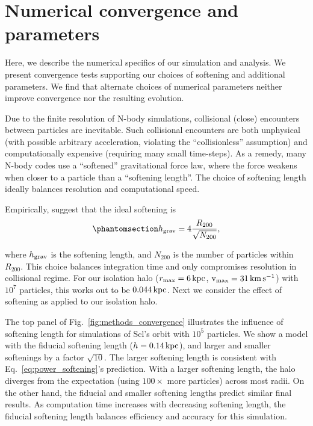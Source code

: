 \chapter{Numerical convergence and
parameters}\label{sec:extra_convergence}

Here, we describe the numerical specifics of our simulation and
analysis. We present convergence tests supporting our choices of
softening and additional parameters. We find that alternate choices of
numerical parameters neither improve convergence nor the resulting
evolution.

Due to the finite resolution of N-body simulations, collisional (close)
encounters between particles are inevitable. Such collisional encounters
are both unphysical (with possible arbitrary acceleration, violating the
``collisionless'' assumption) and computationally expensive (requiring
many small time-steps). As a remedy, many N-body codes use a
``softened'' gravitational force law, where the force weakens when
closer to a particle than a ``softening length''. The choice of
softening length ideally balances resolution and computational speed.

Empirically, \citet{power+2003} suggest that the ideal softening is
\begin{equation}\protect\phantomsection\label{eq:power_softening}{
h_{\rm grav} = 4 \frac{R_{200}}{\sqrt{N_{200}}},
}\end{equation}

where \(h_{\rm grav}\) is the softening length, and \(N_{200}\) is the
number of particles within \(R_{200}\). This choice balances integration
time and only compromises resolution in collisional regime. For our
isolation halo (\(r_{\rm max}=6\,{\rm kpc}\), \({\rm v}_{\rm max}=31\,{\rm km\,s^{-1}}\)) with \(10^7\)
particles, this works out to be \(0.044\,{\rm kpc}\). Next we consider
the effect of softening as applied to our isolation halo.

The top panel of Fig.~\ref{fig:methods_convergence} illustrates the
influence of softening length for simulations of Scl's \smallperi{}
orbit with \(10^5\) particles. We show a model with the fiducial
softening length (\(h=0.14\,{\rm kpc}\)), and larger and smaller softenings
by a factor \(\sqrt{10}\). The larger softening length is consistent
with Eq.~\ref{eq:power_softening}'s prediction. With a larger softening
length, the halo diverges from the expectation (using \(100\times\) more
particles) across most radii. On the other hand, the fiducial and
smaller softening lengths predict similar final results. As computation
time increases with decreasing softening length, the fiducial softening
length balances efficiency and accuracy for this simulation.

